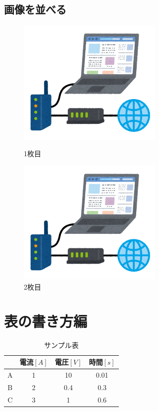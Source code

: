 \documentclass[a4j,uplatex, fleqn]{jsarticle} %
\numberwithin{equation}{section}
\begin{document}
		\subsection{画像を並べる}
			\begin{figure}[H]
				\begin{minipage}[c]{0.5\hsize}
				\centering
				\includegraphics[width=7.0cm]{./pic/internet_computer_wired.png.pdf}
				\caption{1枚目 \label{fig:no1}}
				\end{minipage}
				\begin{minipage}[c]{0.5\hsize}
				\centering
				\includegraphics[width=7.0cm]{./pic/internet_computer_wired.png.pdf}
				\caption{2枚目 \label{fig:no2}}
				\end{minipage}
			\end{figure}
	\section{表の書き方編}
		\begin{table}[H]
			\centering
			\caption{サンプル表 \label{tab:sample}}
			\begin{tabular}{|c||c|c|c|}
				\hline  & 電流$[A]$ & 電圧$[V]$ & 時間$[s]$ \\ \hline \hline
				A & 1 & 10 & 0.01 \\ \hline
				B & 2 & 0.4 & 0.3 \\ \hline
				C & 3 & 1 & 0.6 \\ \hline
			\end{tabular}
		\end{table}
\end{document}

